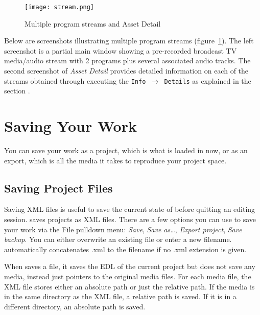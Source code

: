 \begin{figure}[htpb]
    \centering
    \texttt{[image: stream.png]}
    \caption{Multiple program streams and Asset Detail}
    \label{fig:stream}
\end{figure}

Below are screenshots illustrating multiple program streams (figure~\ref{fig:stream}).  The left screenshot is a partial main \CGG{} window showing a pre-recorded broadcast TV media/audio stream with 2 programs plus several associated audio tracks.  The second screenshot of \textit{Asset Detail} provides detailed information on each of the streams obtained through executing the \texttt{Info $\rightarrow$  Details} as explained in the section .

\section{Saving Your Work}%
\label{sec:saving_your_work}

You can save your work as a project, which is what is loaded in \CGG{} now, or as an export, which is all the media it takes to reproduce your project space.

\subsection{Saving Project Files}%
\label{sub:saving_project_files}

Saving  XML files is useful to save the current state of \CGG{} before quitting an editing session. \CGG{} saves projects as XML files. There are a few options you can use to save your work via the File pulldown menu: \textit{Save}, \textit{Save as\dots}, \textit{Export project}, \textit{Save backup}.  You can either overwrite an existing file or enter a new filename. \CGG{} automatically concatenates .xml to the filename if no .xml extension is given.

When \CGG{} saves a file, it saves the EDL of the current project but does not save any media, instead just pointers to the original media files. For each media file, the XML file stores either an absolute path or just the relative path. If the media is in the same directory as the XML file, a relative path is saved. If it is in a different directory, an absolute path is saved.

